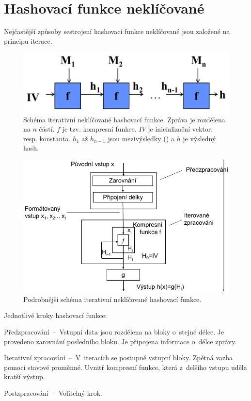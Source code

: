 
\section{Hashovací funkce neklíčované}

Nejčastější způsoby sestrojení hashovací funkce neklíčované jsou založené na principu iterace.

\begin{figure}[H]
    \centering
    \includegraphics[width=0.6\linewidth]{hash_function_iterative.pdf}
    \caption{Schéma iterativní neklíčované hashovací funkce. Zpráva je rozdělena na $n$ částí. $f$ je tzv. kompresní funkce. $IV$ je inicializační vektor, resp. konstanta. $h_1$ až $h_{n-1}$ jsou mezivýsledky () a $h$ je výsledný hash.}
\end{figure}

\begin{figure}[H]
    \centering
    \includegraphics[width=0.9\linewidth]{hash_function_iterative_detail.pdf}
    \caption{Podrobnější schéma iterativní neklíčované hashovací funkce.}
\end{figure}

Jednotlivé kroky hashovací funkce: \begin{compactitem}
    \item Předzpracování~--~Vstupní data jsou rozdělena na bloky o~stejné délce. Je provedeno zarovnání posledního bloku. Je připojena informace o~délce zprávy.
    \item Iterativní zpracování~--~V~iteracích se postupně  vstupní bloky. Zpět\-ná vazba pomocí stavové proměnné. Uvnitř kompresní funkce, která z~delšího vstupu uděla kratší výstup.
    \item Postzpracování~--~Volitelný krok.
\end{compactitem}

